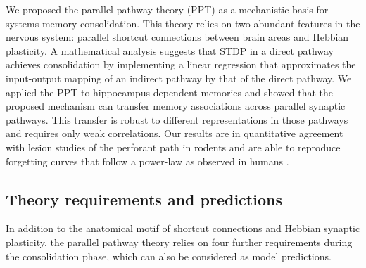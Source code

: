 
We proposed the parallel pathway theory (PPT) as a mechanistic basis for systems memory consolidation. This theory relies on two abundant features in the nervous system: parallel shortcut connections between brain areas and Hebbian plasticity.
A mathematical analysis suggests that STDP in a direct pathway achieves consolidation by implementing a linear regression that approximates the input-output mapping of an indirect pathway by that of the direct pathway.
We applied the PPT to hippocampus-dependent memories and showed that the proposed mechanism can transfer memory associations across parallel synaptic pathways. This transfer is robust to different representations in those pathways and requires only weak correlations.
Our results are in quantitative agreement with lesion studies of the perforant path in rodents \cite{Remondes2004} and are able to reproduce forgetting curves that follow a power-law as observed in humans \cite{Wixted2004}.

\subsection{Theory requirements and predictions}
In addition to the anatomical motif of shortcut connections and Hebbian synaptic plasticity, the parallel pathway theory relies on four further requirements during the consolidation phase, which can also be considered as model predictions.

